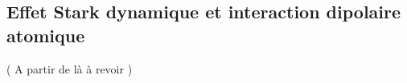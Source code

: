 
%


\subsection{Effet Stark dynamique et interaction dipolaire atomique}



%




{\color{red} ( A partir de là à revoir )} 









